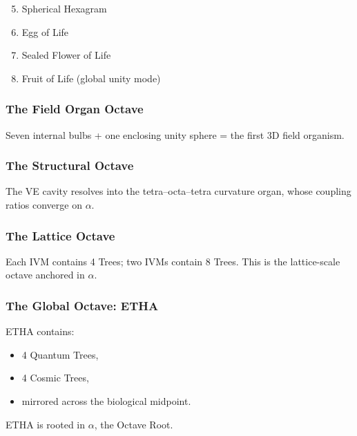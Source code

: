 \begin{enumerate}
    \setcounter{enumi}{4}
    \item Spherical Hexagram
    \item Egg of Life
    \item Sealed Flower of Life
    \item Fruit of Life (global unity mode)
\end{enumerate}

\subsubsection{The Field Organ Octave}

Seven internal bulbs + one enclosing unity sphere = the first 3D field organism.

\subsubsection{The Structural Octave}

The VE cavity resolves into the tetra–octa–tetra curvature organ, whose coupling ratios converge on $\alpha$.

\subsubsection{The Lattice Octave}

Each IVM contains 4 Trees; two IVMs contain 8 Trees.  
This is the lattice-scale octave anchored in $\alpha$.

\subsubsection{The Global Octave: ETHA}

ETHA contains:

\begin{itemize}
    \item 4 Quantum Trees,
    \item 4 Cosmic Trees,
    \item mirrored across the biological midpoint.
\end{itemize}

ETHA is rooted in $\alpha$, the Octave Root.

